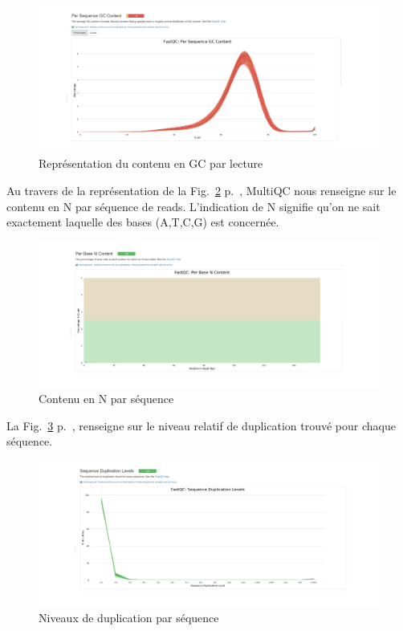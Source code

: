 \documentclass[a4paper,11pt]{article}
\begin{document}
\begin{figure}
  \begin{center}
    \includegraphics[width=16cm]{Images/MultiQC_Plots4}
  \end{center}
  \caption{Représentation du contenu en GC par lecture}
  \label{fig-MultiQC_Plots4}
\end{figure}

Au travers de la représentation de la Fig.~\ref{fig-MultiQC_Plots5}
p.~\pageref{fig-MultiQC_Plots5}, MultiQC nous renseigne sur le contenu
en \og{}N\fg{} par séquence de reads. L'indication de N signifie qu'on
ne sait exactement laquelle des bases (A,T,C,G) est concernée.

\begin{figure}
  \begin{center}
    \includegraphics[width=16cm]{Images/MultiQC_Plots5}
  \end{center}
  \caption{Contenu en \og{}N\fg{} par séquence}
  \label{fig-MultiQC_Plots5}
\end{figure}

La Fig.~\ref{fig-MultiQC_Plots6} p.~\pageref{fig-MultiQC_Plots6},
renseigne sur le niveau relatif de duplication trouvé pour chaque
séquence.

\begin{figure}
  \begin{center}
    \includegraphics[width=16cm]{Images/MultiQC_Plots6}
  \end{center}
  \caption{Niveaux de duplication par séquence}
  \label{fig-MultiQC_Plots6}
\end{figure}
\end{document}
